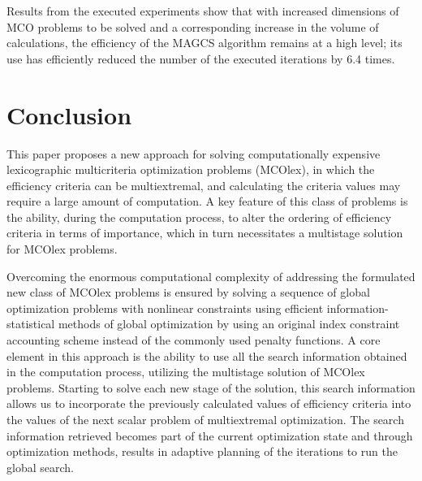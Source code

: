 \documentclass[smallextended]{svjour3}       %
\begin{document}
\begin{table}[ht]
\centering
\caption{Results of the series of experiments to solve two-criteria four-dimensional MCO}
\label{tab:3}
\end{table}


Results from the executed experiments show that with increased dimensions of MCO problems to be solved and a corresponding increase in the volume of calculations, the efficiency of the MAGCS algorithm remains at a high level;  its use has efficiently reduced the number of the executed iterations by 6.4 times.



\section{Conclusion}
\label{sec:5}

This paper proposes a new approach for solving computationally expensive lexicographic multicriteria optimization problems (MCOlex), in which the efficiency criteria can be multiextremal, and calculating the criteria values may require a large amount of computation. A key feature of this class of problems is the ability, during the computation process, to alter the ordering of efficiency criteria in terms of importance, which in turn necessitates a multistage solution for MCOlex problems.

Overcoming the enormous computational complexity of addressing the formulated new class of MCOlex problems is ensured by solving a sequence of global optimization problems with nonlinear constraints using efficient information-statistical methods of global optimization by using an original index constraint accounting scheme instead of the commonly used penalty functions. A core element in this approach is the ability to use all the search information obtained in the computation process, utilizing the multistage solution of MCOlex problems. Starting to solve each new stage of the solution, this search information allows us to incorporate the previously calculated values of efficiency criteria into the values of the next scalar problem of multiextremal optimization. The search information retrieved becomes part of the current optimization state and through optimization methods, results in adaptive planning of the iterations to run the global search. 
\end{document}
